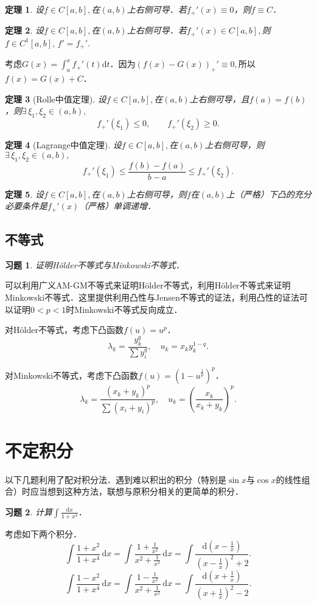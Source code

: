 \documentclass[11pt,a4paper]{ctexart}
\makeatletter
\theoremstyle{thmseries} %
\newtheorem{thm}{定理}[section]
\theoremstyle{exerseries}
\newtheorem{exer}{习题}[section]
\renewenvironment{proof}[1][\proofname]{\par
  \pushQED{\qed}%
  \normalfont \topsep6\p@\@plus6\p@\relax
  \trivlist
  \item[\hskip\labelsep
        \itshape
    #1\@addpunct{}]\ignorespaces
}{%
  \popQED\endtrivlist\@endpefalse
}
\newenvironment{sol}{\begin{proof}[\bfseries\upshape 解\quad]}{\end{proof}}
\newenvironment{pf}{\begin{proof}[\bfseries\upshape 证\quad]}{\end{proof}}
\newcommand{\bra}[1]{\mathopen{}\left(#1\right)}
\renewcommand{\d}{\mathrm{d}}
\makeatother
\begin{document}
\begin{thm}
	设$f\in C[a,b],$在$(a,b)$上右侧可导．若$f_+'(x)\equiv0$，则$f\equiv C$．
\end{thm}

\begin{thm}
	设$f\in C[a,b],$在$(a,b)$上右侧可导．若$f_+'(x)\in C[a,b],$则$f\in C^1[a,b],\,f'=f_+'$.
\end{thm}
\begin{pf}
	考虑$G(x)=\int_{a}^{x}f_+'(t)\d t$．因为$\bra{f(x)-G(x)}_+'\equiv0,$所以$f(x)=G(x)+C$．
\end{pf}

\begin{thm}[Rolle中值定理]
	设$f\in C[a,b],$在$(a,b)$上右侧可导，且$f(a)=f(b)$，则$\exists\,\xi_1,\xi_2\in(a,b),$
	\[f_+'(\xi_1)\leq0,\qquad f_+'(\xi_2)\geq0.\]
\end{thm}

\begin{thm}[Lagrange中值定理]
	设$f\in C[a,b],$在$(a,b)$上右侧可导，则$\exists\,\xi_1,\xi_2\in(a,b),$
	\[f_+'(\xi_1)\leq\frac{f(b)-f(a)}{b-a}\leq f_+'(\xi_2).\]
\end{thm}

\begin{thm}
	设$f\in C[a,b],$在$(a,b)$上右侧可导，则$f$在$(a,b)$上（严格）下凸的充分必要条件是$f_+'(x)$（严格）单调递增．
\end{thm}


\subsection{不等式}
\begin{exer}
	证明H\"older不等式与Minkowski不等式．
\end{exer}
\begin{pf}
	可以利用广义AM-GM不等式来证明H\"older不等式，利用H\"older不等式来证明Minkowski不等式．这里提供利用凸性与Jensen不等式的证法，利用凸性的证法可以证明$0<p<1$时Minkowski不等式反向成立．

	对H\"older不等式，考虑下凸函数$f(u)=u^p$．
	\[\lambda_k=\frac{y_k^q}{\sum y_i^q},\quad u_k=x_ky_k^{1-q}.\]

	对Minkowski不等式，考虑下凸函数$f(u)=\bra{1-u^{\frac{1}{p}}}^p$．
	\[\lambda_k=\frac{(x_k+y_k)^p}{\sum(x_i+y_i)^p},\quad u_k=\bra{\frac{x_k}{x_k+y_k}}^p.\]
\end{pf}


\section{不定积分}
以下几题利用了配对积分法．遇到难以积出的积分（特别是$\sin x$与$\cos x$的线性组合）时应当想到这种方法，联想与原积分相关的更简单的积分．
\begin{exer}
	计算$\int\frac{\d x}{1+x^4}$．
\end{exer}
\begin{sol}
	考虑如下两个积分．
	\[\int\frac{1+x^2}{1+x^4}\,\d x=\int\frac{1+\frac{1}{x^2}}{x^2+\frac{1}{x^2}}\,\d x=\int\frac{\d\bra{x-\frac{1}{x}}}{\bra{x-\frac{1}{x}}^2+2}.\]
	\[\int\frac{1-x^2}{1+x^4}\,\d x=\int\frac{1-\frac{1}{x^2}}{x^2+\frac{1}{x^2}}\,\d x=\int\frac{\d\bra{x+\frac{1}{x}}}{\bra{x+\frac{1}{x}}^2-2}.\]
\end{sol}
\end{document}
